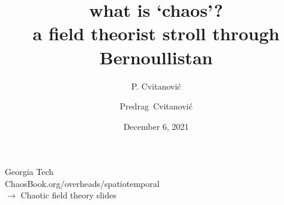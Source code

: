 

                        \newif\ifboyscout\boyscouttrue          %
                        \newif\ifsubmission\submissionfalse     %
                        \newif\ifblog\blogfalse %


\usepackage[font=scriptsize, labelfont=bf]{caption}
\usepackage[
    backend=biber,  %
    sorting=nyt,
    style=numeric, %
    natbib=true,
    style=phys, %
    biblabel= brackets, %
    articletitle=false, %
    pageranges = true , %
    sortlocale=en_US,
    firstinits=true,
    url=false, %
    doi=false, %
    eprint=false
]{biblatex}




\renewcommand{\Ssym}[1]{{\ensuremath{m_{#1}}}}    %
\renewcommand{\jacobianOrb}{Hill matrix}
\renewcommand{\JacobianOrb}{Hill matrix}



\title{
{\huge what is `chaos'?} %
    \\
{a field theorist stroll through Bernoullistan}
}
\author{P. Cvitanovi\'c}
\author[Cvitanovi\'c]
{
  \textcolor{green!50!black}{
  {Predrag~Cvitanovi\'c
  }	%
  }
}
\institute
{               Georgia Tech     \\
    {\scriptsize
 ChaosBook.org/overheads/spatiotemporal \\
 $\to$ Chaotic field theory slides
    }
 }
\date{December 6, 2021}

